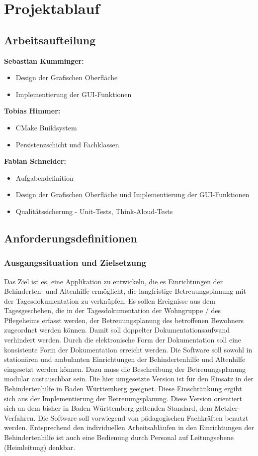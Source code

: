 \section{Projektablauf}

\subsection{Arbeitsaufteilung}
\textbf{Sebastian Kumminger:}
\begin{itemize}
	\item Design der Grafischen Oberfläche
	\item Implementierung der GUI-Funktionen
\end{itemize}
\textbf{Tobias Himmer:}
\begin{itemize}
	\item CMake Buildsystem
	\item Persistenzschicht und Fachklassen
\end{itemize}
\textbf{Fabian Schneider:}
\begin{itemize}
	\item Aufgabendefinition
	\item Design der Grafischen Oberfläche und Implementierung der GUI-Funktionen
	\item Qualitätssicherung - Unit-Tests, Think-Aloud-Tests
\end{itemize}

\subsection{Anforderungsdefinitionen}

\subsubsection{Ausgangssituation und Zielsetzung}
\label{subsubsec:ziel}
Das Ziel ist es, eine Applikation zu entwickeln, die es Einrichtungen der Behinderten- und Altenhilfe ermöglicht,
die langfristige Betreuungsplanung mit der Tagesdokumentation zu verknüpfen. Es sollen Ereignisse aus dem Tagesgeschehen,
die in der Tagesdokumentation der Wohngruppe / des Pflegeheims erfasst werden,
der Betreuungsplanung des betroffenen Bewohners zugeordnet werden können.
Damit soll doppelter Dokumentationsaufwand verhindert werden. Durch die elektronische Form der Dokumentation soll eine konsistente Form der Dokumentation erreicht werden. 
Die Software soll sowohl in stationären und ambulanten Einrichtungen der Behindertenhilfe und Altenhilfe eingesetzt werden können. Dazu muss die Beschreibung der Betreuungsplanung modular austauschbar sein. Die hier umgesetzte Version ist für den Einsatz in der Behindertenhilfe in Baden Württemberg geeignet. 
Diese Einschränkung ergibt sich aus der Implementierung der Betreuungsplanung. Diese Version orientiert sich an dem bisher in Baden Württemberg
geltenden Standard, dem Metzler-Verfahren.
Die Software soll vorwiegend von pädagogischen Fachkräften benutzt werden. Entsprechend den individuellen Arbeitsabläufen in den 
Einrichtungen der Behindertenhilfe ist auch eine Bedienung durch Personal auf Leitungsebene (Heimleitung) denkbar\cite{Pflichtenheft}.


